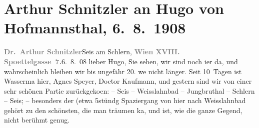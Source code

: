 

         
         \renewcommand{\erwaehntePersonen}{Personen: Otto Brahm, Hugo von Hofmannsthal, Arthur Kaufmann, Olga Schnitzler, Agnes Ulmann, Jakob Wassermann}
         \renewcommand{\erwaehnteOrte}{Orte: Edmund-Weiß-Gasse, Jungbrunntal, Madonna di Campiglio, München, San Martino di Castrozza, Schlern, Seis am Schlern, Sils im Engadin, Weisslahnbad}
         \renewcommand{\erwaehnteWerke}{Werke: Der Weg ins Freie. Roman}
               \section[Arthur Schnitzler an Hugo von Hofmannsthal, 6. 8. 1908]{ Arthur Schnitzler an Hugo von Hofmannsthal, 6. 8. 1908}\nopagebreak{}\rehead{ }\begin{ledgroupsized}[t]{13cm}\normalsize\beginnumbering \toendnotes[C]{\smallbreak\pagebreak[2]} 
\toendnotes[C]{\smallbreak}\pstart
           {\pb}\textcolor{gray}{\textbf{Dr. Arthur Schnitzler}}\hfill Seis am Schlern,\pend
           \pstart
           \textcolor{gray}{\textbf{Wien XVIII. Spoettelgasse 7.}}\hfill 6. 8. 08\pend
           \pstart{}lieber Hugo, \pend\pstart
           Sie sehen, wir sind noch i{\geminationm}er da, und wahrscheinlich
               bleiben wir bis ungefähr 20. we{\geminationn} nicht
               länger. Seit 10 Tagen ist Wasserma{\geminationn} hier, Agnes Speyer, Doctor Kaufmann, und gestern sind wir von einer sehr
               schönen Partie zurückgeko{\geminationm}en: – Seis – Weisslahnbad – Jungbru{\geminationn}thal – Schlern – Seis; – besonders der (etwa 5stündg Spaziergang von hier nach Weisslahnbad gehört zu {\pb}den schönsten, die man träumen ka{\geminationn}, und ist, wie die ganze Gegend, nicht berühmt genug.

\end{ledgroupsized}
